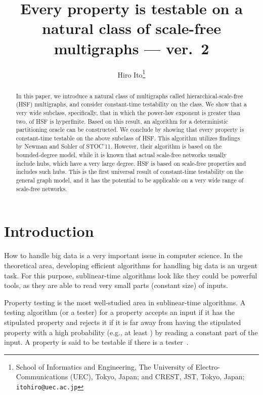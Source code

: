 \documentclass[11pt]{article}
\title{Every property is testable on a natural class of scale-free multigraphs --- ver.~2}
\author{
Hiro Ito\thanks{
     School of Informatics and Engineering, 
    The University of Electro-Communications (UEC), 
    Tokyo, Japan; and
    CREST, JST, Tokyo, Japan; 
    {\tt itohiro@uec.ac.jp}
    }
}
\begin{document}
\setcounter{page}{0}

\maketitle



\begin{abstract}
In this paper, we introduce a natural class of multigraphs called hierarchical-scale-free (HSF) multigraphs, and consider constant-time testability on the class. 
We show that a very wide subclass, specifically, that in which the power-law exponent is greater than two, 
of HSF is hyperfinite. 
Based on this result, an algorithm for a deterministic partitioning oracle can 
be constructed.  
We conclude by showing that every property is constant-time testable 
on the above subclass of HSF. 
This algorithm utilizes findings by Newman and Sohler of STOC'11.  
However, their algorithm is based on the bounded-degree model, 
while it is known that actual scale-free networks 
usually include hubs, which have a very large degree.  
HSF is based on scale-free properties and includes such hubs.
This is the first universal result of constant-time testability on  
the general graph model, and it has the potential to be applicable on  a very wide range of scale-free networks. 
\end{abstract}


\newpage
\section{Introduction}




How to handle big data is a very important issue in computer science. 
In the theoretical area, developing efficient algorithms for handling big data 
is an urgent task. 
For this purpose, sublinear-time algorithms look like they could be powerful tools, 
as they are able to read very small parts (constant size) of inputs. 

Property testing is the most well-studied area in sublinear-time algorithms. 
A testing algorithm (or a tester) for a property accepts an input if it has the stipulated property and rejects it if it is far away from having the stipulated property with a high probability (e.g., at least ) by reading 
a constant part of the input. 
A property is said to be testable if there is a tester~\cite{PropertyTestingLNCS10}. 
\end{document}
